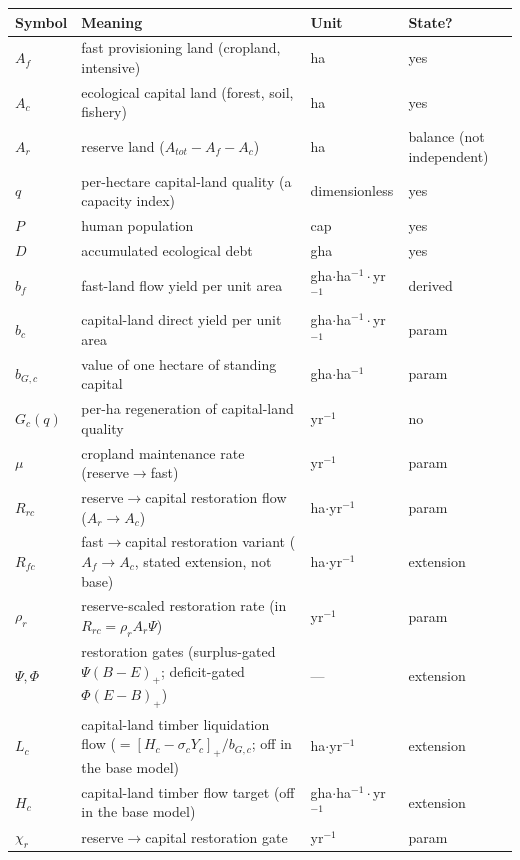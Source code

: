 \documentclass[11pt]{article}
\begin{document}
\begin{table}[htbp]
\centering
\small
\begin{tabularx}{\textwidth}{>{\raggedright\arraybackslash}X>{\raggedright\arraybackslash}X>{\raggedright\arraybackslash}X>{\raggedright\arraybackslash}X}
\toprule
Symbol & Meaning & Unit & State? \\
\midrule
$A_f$ & fast provisioning land (cropland, intensive) & ha & yes \\
$A_c$ & ecological capital land (forest, soil, fishery) & ha & yes \\
$A_r$ & reserve land ($A_{tot}-A_f-A_c$) & ha & balance (not independent) \\
$q$ & per-hectare capital-land quality (a capacity index) & dimensionless & yes \\
$P$ & human population & cap & yes \\
$D$ & accumulated ecological debt & gha & yes \\
$b_f$ & fast-land flow yield per unit area & gha$\cdot$ha$^{-1}\cdot$yr$^{-1}$ & derived \\
$b_c$ & capital-land direct yield per unit area & gha$\cdot$ha$^{-1}\cdot$yr$^{-1}$ & param \\
$b_{G,c}$ & value of one hectare of standing capital & gha$\cdot$ha$^{-1}$ & param \\
$G_c(q)$ & per-ha regeneration of capital-land quality & yr$^{-1}$ & no \\
$\mu$ & cropland maintenance rate (reserve$\to$fast) & yr$^{-1}$ & param \\
$R_{rc}$ & reserve$\to$capital restoration flow ($A_r\to A_c$) & ha$\cdot$yr$^{-1}$ & param \\
$R_{fc}$ & fast$\to$capital restoration variant ($A_f\to A_c$, stated extension, not base) & ha$\cdot$yr$^{-1}$ & extension \\
$\rho_r$ & reserve-scaled restoration rate (in $R_{rc}=\rho_r A_r \Psi$) & yr$^{-1}$ & param \\
$\Psi,\Phi$ & restoration gates (surplus-gated $\Psi(B-E)_+$; deficit-gated $\Phi(E-B)_+$) & --- & extension \\
$L_c$ & capital-land timber liquidation flow ($=[H_c-\sigma_cY_c]_+/b_{G,c}$; off in the base model) & ha$\cdot$yr$^{-1}$ & extension \\
$H_c$ & capital-land timber flow target (off in the base model) & gha$\cdot$ha$^{-1}\cdot$yr$^{-1}$ & extension \\
$\chi_r$ & reserve$\to$capital restoration gate & yr$^{-1}$ & param \\

\end{tabularx}
\end{table}
\end{document}
